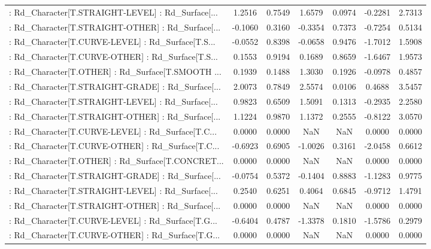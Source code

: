 \begin{longtable}{p{4cm}cccccc}
 : Rd\_Character[T.STRAIGHT-LEVEL] : Rd\_Surface[... &  1.2516 &    0.7549 &  1.6579 &       0.0974 & -0.2281 &  2.7313 \\
 : Rd\_Character[T.STRAIGHT-OTHER] : Rd\_Surface[... & -0.1060 &    0.3160 & -0.3354 &       0.7373 & -0.7254 &  0.5134 \\
 : Rd\_Character[T.CURVE-LEVEL] : Rd\_Surface[T.S... & -0.0552 &    0.8398 & -0.0658 &       0.9476 & -1.7012 &  1.5908 \\
 : Rd\_Character[T.CURVE-OTHER] : Rd\_Surface[T.S... &  0.1553 &    0.9194 &  0.1689 &       0.8659 & -1.6467 &  1.9573 \\
 : Rd\_Character[T.OTHER] : Rd\_Surface[T.SMOOTH ... &  0.1939 &    0.1488 &  1.3030 &       0.1926 & -0.0978 &  0.4857 \\
 : Rd\_Character[T.STRAIGHT-GRADE] : Rd\_Surface[... &  2.0073 &    0.7849 &  2.5574 &       0.0106 &  0.4688 &  3.5457 \\
 : Rd\_Character[T.STRAIGHT-LEVEL] : Rd\_Surface[... &  0.9823 &    0.6509 &  1.5091 &       0.1313 & -0.2935 &  2.2580 \\
 : Rd\_Character[T.STRAIGHT-OTHER] : Rd\_Surface[... &  1.1224 &    0.9870 &  1.1372 &       0.2555 & -0.8122 &  3.0570 \\
 : Rd\_Character[T.CURVE-LEVEL] : Rd\_Surface[T.C... &  0.0000 &    0.0000 &     NaN &          NaN &  0.0000 &  0.0000 \\
 : Rd\_Character[T.CURVE-OTHER] : Rd\_Surface[T.C... & -0.6923 &    0.6905 & -1.0026 &       0.3161 & -2.0458 &  0.6612 \\
 : Rd\_Character[T.OTHER] : Rd\_Surface[T.CONCRET... &  0.0000 &    0.0000 &     NaN &          NaN &  0.0000 &  0.0000 \\
 : Rd\_Character[T.STRAIGHT-GRADE] : Rd\_Surface[... & -0.0754 &    0.5372 & -0.1404 &       0.8883 & -1.1283 &  0.9775 \\
 : Rd\_Character[T.STRAIGHT-LEVEL] : Rd\_Surface[... &  0.2540 &    0.6251 &  0.4064 &       0.6845 & -0.9712 &  1.4791 \\
 : Rd\_Character[T.STRAIGHT-OTHER] : Rd\_Surface[... &  0.0000 &    0.0000 &     NaN &          NaN &  0.0000 &  0.0000 \\
 : Rd\_Character[T.CURVE-LEVEL] : Rd\_Surface[T.G... & -0.6404 &    0.4787 & -1.3378 &       0.1810 & -1.5786 &  0.2979 \\
 : Rd\_Character[T.CURVE-OTHER] : Rd\_Surface[T.G... &  0.0000 &    0.0000 &     NaN &          NaN &  0.0000 &  0.0000 \\

\end{longtable}
